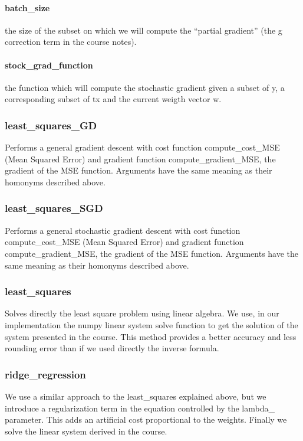 \documentclass[10pt,conference,compsocconf]{IEEEtran}
\begin{document}
\paragraph{batch\_size} the size of the subset on which we will compute the ``partial gradient'' (the g correction term in the course notes).
\paragraph{stock\_grad\_function} the function which will compute the stochastic gradient given a subset of y, a corresponding subset of tx and the current weigth vector w.

\subsubsection{least\_squares\_GD}
Performs a general gradient descent with cost function compute\_cost\_MSE (Mean Squared Error) and gradient function compute\_gradient\_MSE, the gradient of the MSE function. Arguments have the same meaning as their homonyms described above.

\subsubsection{least\_squares\_SGD}
Performs a general stochastic gradient descent with cost function compute\_cost\_MSE (Mean Squared Error) and gradient function compute\_gradient\_MSE, the gradient of the MSE function. Arguments have the same meaning as their homonyms described above.

\subsubsection{least\_squares}
Solves directly the least square problem using linear algebra. We use, in our implementation the numpy linear system solve function to get the solution of the system presented in the course. This method provides a better accuracy and less rounding error than if we used directly the inverse formula.

\subsubsection{ridge\_regression}
We use a similar approach to the least\_squares explained above, but we introduce a regularization term in the equation controlled by the lambda\_ parameter. This adds an artificial cost proportional to the weights. Finally we solve the linear system derived in the course.
\end{document}
